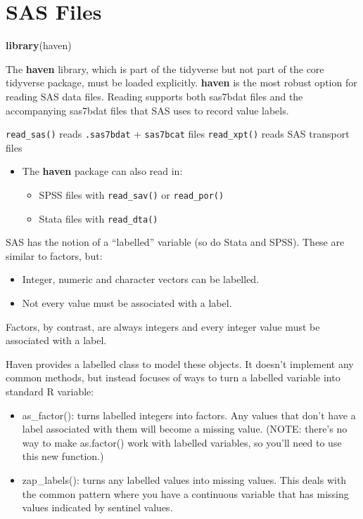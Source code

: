 \documentclass[]{book}
\newenvironment{Shaded}{\begin{snugshade}}{\end{snugshade}}
\newcommand{\KeywordTok}[1]{\textcolor[rgb]{0.13,0.29,0.53}{\textbf{#1}}}
\newcommand{\NormalTok}[1]{#1}
\providecommand{\tightlist}{%
  \setlength{\itemsep}{0pt}\setlength{\parskip}{0pt}}
\newenvironment{rmdblock}[1]
  {\begin{shaded*}
  \begin{itemize}
  \renewcommand{\labelitemi}{
    \raisebox{-.7\height}[0pt][0pt]{
      {\setkeys{Gin}{width=3em,keepaspectratio}\texttt{[image: images/\#1]}}
    }
  }
  \item
  }
  {
  \end{itemize}
  \end{shaded*}
  }
\newenvironment{rmdnote}
  {\begin{rmdblock}{note}}
  {\end{rmdblock}}
\begin{document}
\section{SAS Files}\label{sas-files}

\begin{Shaded}
\begin{Highlighting}[]
\KeywordTok{library}\NormalTok{(haven)}
\end{Highlighting}
\end{Shaded}

The \textbf{haven} library, which is part of the tidyverse but not part
of the core tidyverse package, must be loaded explicitly. \textbf{haven}
is the most robust option for reading SAS data files. Reading supports
both sas7bdat files and the accompanying sas7bdat files that SAS uses to
record value labels.

\texttt{read\_sas()} reads \texttt{.sas7bdat} + \texttt{sas7bcat} files
\texttt{read\_xpt()} reads SAS transport files

\begin{rmdnote}
The \textbf{haven} package can also read in:

\begin{itemize}
\tightlist
\item
  SPSS files with \texttt{read\_sav()} or \texttt{read\_por()}
\item
  Stata files with \texttt{read\_dta()}
\end{itemize}
\end{rmdnote}

SAS has the notion of a ``labelled'' variable (so do Stata and SPSS).
These are similar to factors, but:

\begin{itemize}
\item
  Integer, numeric and character vectors can be labelled.
\item
  Not every value must be associated with a label.
\end{itemize}

Factors, by contrast, are always integers and every integer value must
be associated with a label.

Haven provides a labelled class to model these objects. It doesn't
implement any common methods, but instead focuses of ways to turn a
labelled variable into standard R variable:

\begin{itemize}
\item
  as\_factor(): turns labelled integers into factors. Any values that
  don't have a label associated with them will become a missing value.
  (NOTE: there's no way to make as.factor() work with labelled
  variables, so you'll need to use this new function.)
\item
  zap\_labels(): turns any labelled values into missing values. This
  deals with the common pattern where you have a continuous variable
  that has missing values indicated by sentinel values.
\end{itemize}
\end{document}
